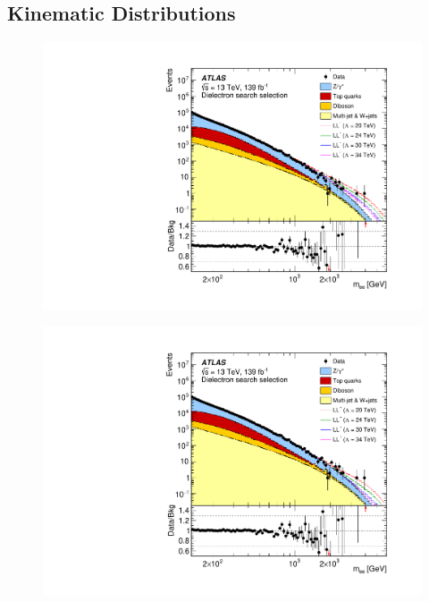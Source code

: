 \subsection{Kinematic Distributions}\label{sec:ciKine}

\begin{figure}[h!]
\captionsetup[subfigure]{position=b}
\centering
 \begin{minipage}[b]{.45\linewidth}
    \includegraphics[width=1\textwidth]{figures/ci/dataMc/figaux_05a.pdf}
    \subcaption{}\label{fig:1a}
\end{minipage}
\begin{minipage}[b]{.45\linewidth}
    \includegraphics[width=1\textwidth]{figures/ci/dataMc/figaux_05b.pdf}
    \subcaption{}
\end{minipage} \\

\end{figure}
